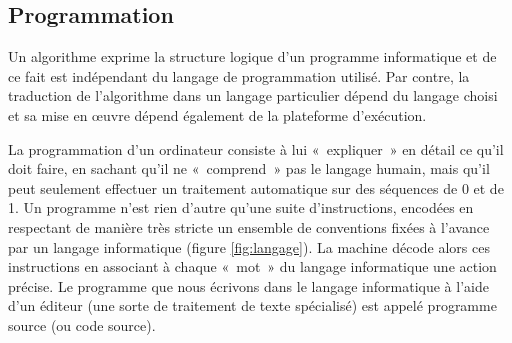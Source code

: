 \subsection{Programmation}
Un algorithme exprime la structure logique d'un programme
informatique et de ce fait est indépendant du langage de programmation 
utilisé. 
Par contre, la traduction de l'algorithme dans un langage particulier
dépend du langage choisi et sa mise en \oe uvre dépend également
de la plateforme d'exécution. 

La programmation d'un ordinateur consiste à lui «~expliquer~» en détail 
ce qu'il doit faire, en sachant qu'il ne «~comprend~» pas le langage humain, 
mais qu'il peut seulement effectuer un traitement 
automatique sur des séquences de 0 et de 1.
Un programme n'est rien d'autre qu'une suite d'instructions, encodées en 
respectant de manière très stricte un ensemble de conventions fixées à 
l'avance par un langage informatique (figure \ref{fig:langage}). 
La machine décode alors
ces instructions en associant à chaque «~mot~»
du langage informatique une action précise.
Le programme que nous écrivons dans le langage informatique
à l'aide d'un éditeur (une sorte de traitement de
texte spécialisé) est appelé programme source (ou code source). 

